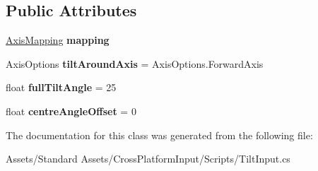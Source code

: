 \subsection*{Public Attributes}
\begin{DoxyCompactItemize}
\item 
\hyperlink{class_unity_standard_assets_1_1_cross_platform_input_1_1_tilt_input_1_1_axis_mapping}{Axis\+Mapping} {\bfseries mapping}\hypertarget{class_unity_standard_assets_1_1_cross_platform_input_1_1_tilt_input_a825e259327ff4204d651876bb30d22f9}{}\label{class_unity_standard_assets_1_1_cross_platform_input_1_1_tilt_input_a825e259327ff4204d651876bb30d22f9}

\item 
Axis\+Options {\bfseries tilt\+Around\+Axis} = Axis\+Options.\+Forward\+Axis\hypertarget{class_unity_standard_assets_1_1_cross_platform_input_1_1_tilt_input_ad83fbef4affa001aab207586dd91e2e7}{}\label{class_unity_standard_assets_1_1_cross_platform_input_1_1_tilt_input_ad83fbef4affa001aab207586dd91e2e7}

\item 
float {\bfseries full\+Tilt\+Angle} = 25\hypertarget{class_unity_standard_assets_1_1_cross_platform_input_1_1_tilt_input_a92a6ef18b52f2409658b7a50037ac831}{}\label{class_unity_standard_assets_1_1_cross_platform_input_1_1_tilt_input_a92a6ef18b52f2409658b7a50037ac831}

\item 
float {\bfseries centre\+Angle\+Offset} = 0\hypertarget{class_unity_standard_assets_1_1_cross_platform_input_1_1_tilt_input_aac904601039bbf6561ee00f0d492c941}{}\label{class_unity_standard_assets_1_1_cross_platform_input_1_1_tilt_input_aac904601039bbf6561ee00f0d492c941}

\end{DoxyCompactItemize}


The documentation for this class was generated from the following file\+:\begin{DoxyCompactItemize}
\item 
Assets/\+Standard Assets/\+Cross\+Platform\+Input/\+Scripts/Tilt\+Input.\+cs\end{DoxyCompactItemize}

